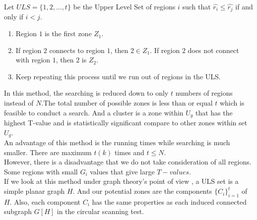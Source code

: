 \documentclass[12pt]{article}
\begin{document}
\begin{enumerate}
				Let $ULS= \{1,2,\dots,t\}$ be the Upper Level Set of regions $i$ such that $\hat{r_i} \leq \hat{r_j}$ if and only if $i < j$.  
				\begin{enumerate}
					\item Region $1$ is the first zone $Z_1$. 
					\item If region $2$ connects to region $1$, then $2 \in Z_1$. If region $2$ does not connect with region $1$, then $2$ is $Z_2$. 
					\item Keep repeating this process until we run out of regions in the ULS. \\   
				\end{enumerate}
			 In this method, the searching is reduced down to only $t$ numbers of regions instead of $N$.The total number of possible zones is less than or equal $t$ which is feasible to conduct a search. And a cluster is a zone within $U_g$ that has the highest T-value and is statistically significant compare to other zones within set $U_g$.\\ 
		An advantage of this method is the running times while searching is much smaller. There are maximum $t(k)$ times and $t \leq N$. \\	
		However, there is a disadvantage that we do not take consideration of all regions. Some regions with small $G_i$ values that give large $T-values$. \\
		
		If we look at this method under graph theory's point of view , a ULS set is a simple planar graph $H$. And our potential zones are the components $\{C_i\}_{i=1}^{t}$ of $H$. Also, each component $C_i$ has the same properties as each induced connected subgraph $G[H]$ in the circular scanning test. \\  
				

\end{enumerate}
\end{document}
